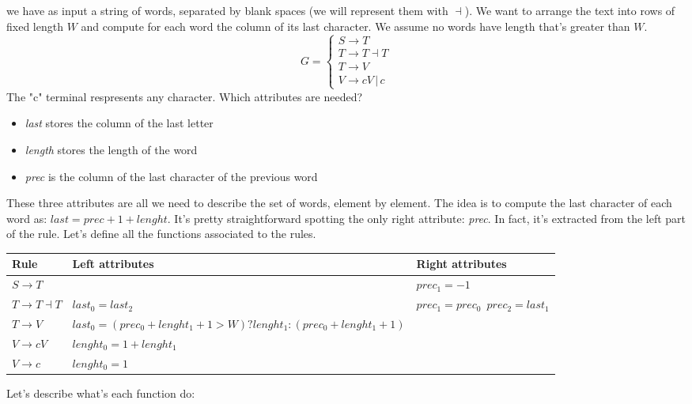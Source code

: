 				we have as input a string of words, separated by blank spaces (we will represent them with $\dashv$). We want to arrange the text into rows of fixed 
				length $W$ and compute for each word the column of its last character. We assume no words have length that's greater than $W$. 
				\begin{equation}
					G = 
					\begin{cases}
						S \rightarrow T \\
						T \rightarrow T \dashv T \\
						T \rightarrow V \\
						V \rightarrow cV \,\vert\, c
					\end{cases}
				\end{equation}
				The "c" terminal respresents any character. Which attributes are needed?
				\begin{itemize}
					\item \emph{last} stores the column of the last letter
					\item \emph{length} stores the length of the word
					\item \emph{prec} is the column of the last character of the previous word
				\end{itemize}
				These three attributes are all we need to describe the set of words, element by element. The idea is to compute the last character of each word as: 
				$last = prec + 1 + lenght$. It's pretty straightforward spotting the only right attribute: \emph{prec}. In fact, it's extracted from the left part of 
				the rule. Let's define all the functions associated to the rules.
				\begin{center}
					\begin{tabular}{| m{3cm} || m{3cm} | m{3cm} | }
						Rule & Left attributes & Right attributes \\
						\hline
						$S \rightarrow T$ & & $prec_1 = -1$\\
						\hline
						$T \rightarrow T \dashv T$ & $last_0 = last_2$ & $prec_1 = prec_0\,\,\,prec_2 = last_1$ \\
						\hline
						$T \rightarrow V $ & $last_0 = (prec_0 + lenght_1 + 1 > W) ? lenght_1 : (prec_0 + lenght_1 + 1)$ &\\
						\hline
						$V \rightarrow cV$ & $lenght_0 = 1 + lenght_1$ & \\
						\hline
						$V \rightarrow c$ & $lenght_0 = 1$ &  
					\end{tabular}
				\end{center}
				Let's describe what's each function do:
